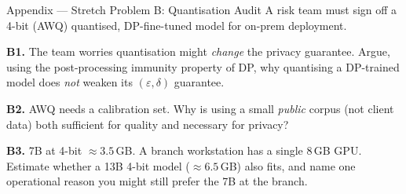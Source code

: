 \documentclass[9pt,t]{beamer}
\begin{document}
\begin{frame}[noframenumbering]{Appendix --- Stretch Problem B: Quantisation Audit}
A risk team must sign off a 4-bit (AWQ) quantised, DP-fine-tuned model for on-prem
deployment.

\medskip
\textbf{B1.} The team worries quantisation might \emph{change} the privacy guarantee.
Argue, using the post-processing immunity property of DP, why quantising a
DP-trained model does \emph{not} weaken its $(\varepsilon,\delta)$ guarantee.

\medskip
\textbf{B2.} AWQ needs a calibration set. Why is using a small \emph{public} corpus
(not client data) both sufficient for quality and necessary for privacy?

\medskip
\textbf{B3.} 7B at 4-bit $\approx 3.5$\,GB. A branch workstation has a single 8\,GB
GPU. Estimate whether a 13B 4-bit model ($\approx 6.5$\,GB) also fits, and name one
operational reason you might still prefer the 7B at the branch.
\end{frame}
\end{document}
